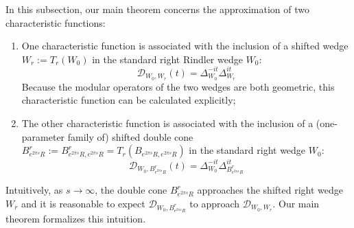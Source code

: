 \documentclass[a4paper,11pt]{article}
\theoremstyle{definition}
\begin{document}
In this subsection, our main theorem concerns the approximation of two characteristic functions:
\begin{enumerate}
    \item One characteristic function is associated with the inclusion of a shifted wedge $W_r := T_r(W_0)$ in the standard right Rindler wedge $W_0$:
    \begin{equation}
        \mathcal{D}_{W_0, W_r}(t) = \Delta_{W_0}^{-it}\Delta_{W_r}^{it}
    \end{equation}
    Because the modular operators of the two wedges are both geometric, this characteristic function can be calculated explicitly;
    \item The other characteristic function is associated with the inclusion of a (one-parameter family of) shifted double cone $B^r_{e^{2\pi s }R}:=B^r_{e^{2\pi s}R, e^{2\pi s}R} = T_r(B_{e^{2\pi s}R, e^{2\pi s}R})$ in the standard right wedge $W_0$:
    \begin{equation}
        \mathcal{D}_{W_0, B^r_{e^{2\pi s}R}}(t) = \Delta_{W_0}^{-it}\Delta_{B^r_{e^{2\pi s}R}}^{it}
    \end{equation}
\end{enumerate}
Intuitively, as $s\rightarrow\infty$, the double cone $B^r_{e^{2\pi s}R}$ approaches the shifted right wedge $W_r$ and it is reasonable to expect $\mathcal{D}_{W_0,B^r_{e^{2\pi s}R}}$ to approach $\mathcal{D}_{W_0, W_r}$. Our main theorem formalizes this intuition.
\end{document}
